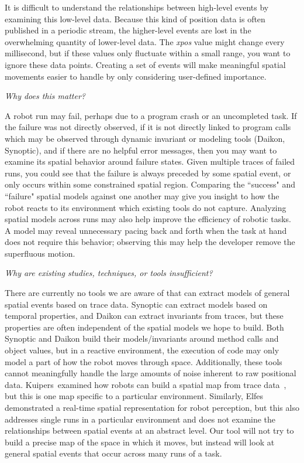 It is difficult to understand the relationships between high-level events by examining this low-level data.  
Because this kind of position data is often published in a periodic stream, the higher-level events are lost in the overwhelming quantity of lower-level data.
The \emph{xpos} value might change every millisecond, but if these values only fluctuate within a small range, you want to ignore these data points.  
Creating a set of events will make meaningful spatial movements easier to handle by only considering user-defined importance.  

\emph{Why does this matter?}  

A robot run may fail, perhaps due to a program crash or an uncompleted task.  
If the failure was not directly observed, if it is not directly linked to program calls which may be observed through dynamic invariant or modeling tools (Daikon, Synoptic), and if there are no helpful error messages, then you may want to examine its spatial behavior around failure states.
Given multiple traces of failed runs, you could see that the failure is always preceded by some spatial event, or only occurs within some constrained spatial region.
Comparing the ``success" and ``failure" spatial models against one another may give you insight to how the robot reacts to its environment which existing tools do not capture.
Analyzing spatial models across runs may also help improve the efficiency of robotic tasks.  
A model may reveal unnecessary pacing back and forth when the task at hand does not require this behavior; observing this may help the developer remove the superfluous motion.

\emph{Why are existing studies, techniques, or tools insufficient?}

There are currently no tools we are aware of that can extract models of general spatial events based on trace data. 
Synoptic can extract models based on temporal properties, and Daikon can extract invariants from traces, but these properties are often independent of the spatial models we hope to build.
Both Synoptic and Daikon build their models/invariants around method calls and object values, but in a reactive environment, the execution of code may only model a part of how the robot moves through space.
Additionally, these tools cannot meaningfully handle the large amounts of noise inherent to raw positional data.
Kuipers~\etal examined how robots can build a spatial map from trace data~\cite{kuipers1988robust}, but this is one map specific to a particular environment.
Similarly, Elfes~\cite{elfes2013occupancy} demonstrated a real-time spatial representation for robot perception, but this also addresses single runs in a particular environment and does not examine the relationships between spatial events at an abstract level.
Our tool will not try to build a precise map of the space in which it moves, but instead will look at general spatial events that occur across many runs of a task.
